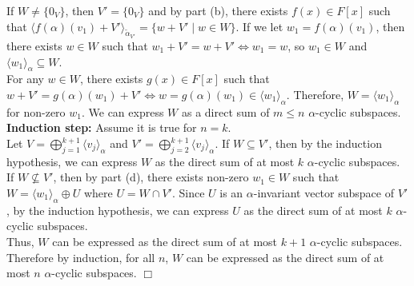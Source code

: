 \documentclass[12pt]{article}
\begin{document}
\begin{enumerate}
        If $W \ne \{0_V\}$, then $V' = \{0_V\}$ and by part (b), there exists $f(x) \in F[x]$ such that $\langle f(\alpha)(v_1) + V' \rangle_{\widetilde{\alpha}_{V'}} = \{w + V' \mid w \in W\}$. If we let $w_1 = f(\alpha)(v_1)$, then there exists $w \in W$ such that $w_1 + V' = w + V' \Leftrightarrow w_1 = w$, so $w_1 \in W$ and $\langle w_1 \rangle_\alpha \subseteq W$. \\
        For any $w \in W$, there exists $g(x) \in F[x]$ such that $w + V' = g(\alpha)(w_1) + V' \Leftrightarrow w = g(\alpha)(w_1) \in \langle w_1 \rangle_\alpha$. Therefore, $W = \langle w_1 \rangle_\alpha$ for non-zero $w_1$. We can express $W$ as a direct sum of $m \le n$ $\alpha$-cyclic subspaces. \\[0.75em]
        \noindent \textbf{Induction step:} Assume it is true for $n = k$. \\
        Let $V = \bigoplus_{j=1}^{k+1} \langle v_j \rangle_\alpha$ and $V' = \bigoplus_{j=2}^{k+1} \langle v_j \rangle_\alpha$. If $W \subseteq V'$, then by the induction hypothesis, we can express $W$ as the direct sum of at most $k$ $\alpha$-cyclic subspaces. \\
        If $W \nsubseteq V'$, then by part (d), there exists non-zero $w_1 \in W$ such that $W = \langle w_1 \rangle_\alpha \oplus U$ where $U = W \cap V'$. Since $U$ is an $\alpha$-invariant vector subspace of $V'$, by the induction hypothesis, we can express $U$ as the direct sum of at most $k$ $\alpha$-cyclic subspaces. \\
        Thus, $W$ can be expressed as the direct sum of at most $k + 1$ $\alpha$-cyclic subspaces. \\

        Therefore by induction, for all $n$, $W$ can be expressed as the direct sum of at most $n$ $\alpha$-cyclic subspaces. \hfill $\Box$
    \end{enumerate} 
    
\end{document}
